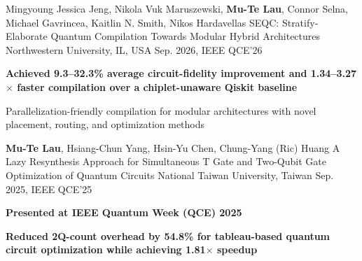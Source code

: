 

\begin{cventries}

    \cventry
        {Mingyoung Jessica Jeng, Nikola Vuk Maruszewski, \textbf{Mu-Te Lau}, Connor Selna, Michael Gavrincea, Kaitlin N. Smith, Nikos Hardavellas}
        {SEQC: Stratify-Elaborate Quantum Compilation Towards Modular Hybrid Architectures
        \href{https://arxiv.org/abs/2501.08478}{\faLink}}
        {Northwestern University, IL, USA}
        {Sep. 2026, IEEE QCE'26}
        {
            \begin{cvitems}
               \item \textcolor{awesome}{\textbf{Achieved 9.3--32.3\% average circuit-fidelity improvement and 1.34--3.27$\times$ faster compilation over a chiplet-unaware Qiskit baseline}}
               \item Parallelization-friendly compilation for modular architectures with novel placement, routing, and optimization methods
            \end{cvitems}
        }

    \cventry
        {\textbf{Mu-Te Lau}, Hsiang-Chun Yang, Hsin-Yu Chen, Chung-Yang (Ric) Huang}
        {A Lazy Resynthesis Approach for Simultaneous T Gate and Two-Qubit Gate Optimization of Quantum Circuits
        \href{https://ieeexplore.ieee.org/abstract/document/11250139}{\faLink}}
        {National Taiwan University, Taiwan}
        {Sep. 2025, IEEE QCE'25}
        {
            \begin{cvitems}
               \item \textcolor{awesome}{\textbf{Presented at IEEE Quantum Week (QCE) 2025}}
               \item \textcolor{awesome}{\textbf{Reduced 2Q-count overhead by 54.8\% for tableau-based quantum circuit optimization while achieving 1.81$\times$ speedup}}
            \end{cvitems}
        }
        

\end{cventries}
